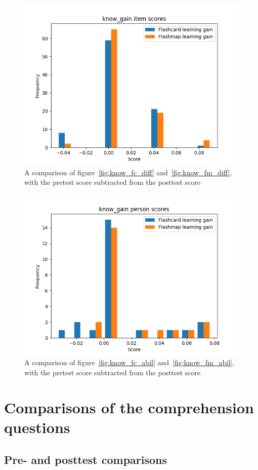 \begin{figure}
    \centering
    \includegraphics[width=.7\textwidth]{img/know_gain_diff.png}
    \caption{A comparison of figure~\protect\ref{fig:know_fc_diff} and~\protect\ref{fig:know_fm_diff}, with the pretest score subtracted from the posttest score}
    \label{fig:know_gain_diff}
\end{figure}
\begin{figure}
    \centering
    \includegraphics[width=.7\textwidth]{img/know_gain_abil.png}
    \caption{A comparison of figure~\protect\ref{fig:know_fc_abil} and~\protect\ref{fig:know_fm_abil}, with the pretest score subtracted from the posttest score}
    \label{fig:know_gain_abil}
\end{figure}

\FloatBarrier
\section{Comparisons of the comprehension questions}

\subsection{Pre- and posttest comparisons}

